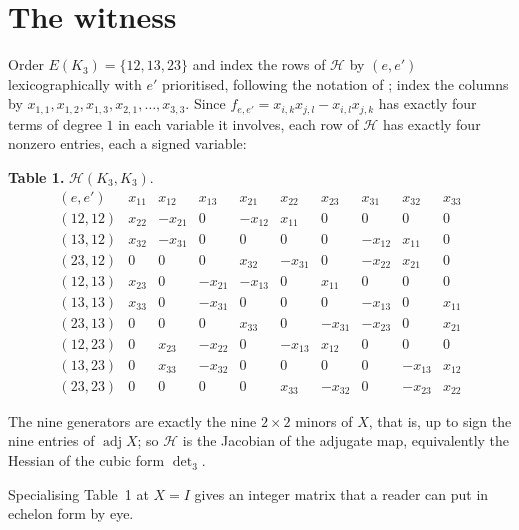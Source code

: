 \documentclass[11pt]{amsart}
\theoremstyle{remark}
\DeclareMathOperator{\adj}{adj}
\newcommand{\Hm}{\mathcal H}
\begin{document}
\section{The witness}

Order $E(K_3)=\{12,13,23\}$ and index the rows of $\Hm$ by $(e,e')$
lexicographically with $e'$ prioritised, following the notation of \cite{LN};
index the columns by
$x_{1,1},x_{1,2},x_{1,3},x_{2,1},\ldots,x_{3,3}$. Since
$f_{e,e'}=x_{i,k}x_{j,l}-x_{i,l}x_{j,k}$ has exactly four terms of degree $1$
in each variable it involves, each row of $\Hm$ has exactly four nonzero
entries, each a signed variable:

\medskip
\noindent\textbf{Table 1.} $\Hm(K_3,K_3)$.
{\small
\[
\begin{array}{r|rrrrrrrrr}
 (e,e') & x_{11} & x_{12} & x_{13} & x_{21} & x_{22} & x_{23}
        & x_{31} & x_{32} & x_{33}\\\hline
 (12,12) & x_{22} & -x_{21} & 0 & -x_{12} & x_{11} & 0 & 0 & 0 & 0\\
 (13,12) & x_{32} & -x_{31} & 0 & 0 & 0 & 0 & -x_{12} & x_{11} & 0\\
 (23,12) & 0 & 0 & 0 & x_{32} & -x_{31} & 0 & -x_{22} & x_{21} & 0\\
 (12,13) & x_{23} & 0 & -x_{21} & -x_{13} & 0 & x_{11} & 0 & 0 & 0\\
 (13,13) & x_{33} & 0 & -x_{31} & 0 & 0 & 0 & -x_{13} & 0 & x_{11}\\
 (23,13) & 0 & 0 & 0 & x_{33} & 0 & -x_{31} & -x_{23} & 0 & x_{21}\\
 (12,23) & 0 & x_{23} & -x_{22} & 0 & -x_{13} & x_{12} & 0 & 0 & 0\\
 (13,23) & 0 & x_{33} & -x_{32} & 0 & 0 & 0 & 0 & -x_{13} & x_{12}\\
 (23,23) & 0 & 0 & 0 & 0 & x_{33} & -x_{32} & 0 & -x_{23} & x_{22}
\end{array}
\]}

\medskip
The nine generators are exactly the nine $2\times2$ minors of $X$, that is, up
to sign the nine entries of $\adj X$; so $\Hm$ is the Jacobian of the adjugate
map, equivalently the Hessian of the cubic form $\det_3$.

Specialising Table~1 at $X=I$ gives an integer matrix that a reader can put in
echelon form by eye.
\end{document}
